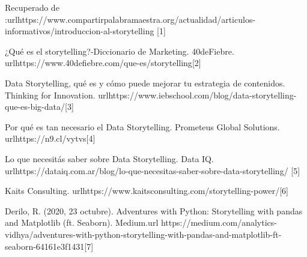 \documentclass[twoside,twocolumn]{article}
\begin{document}
\begin{thebibliography}{} 

	\newblock  Recuperado de :url{https://www.compartirpalabramaestra.org/actualidad/articulos-informativos/introduccion-al-storytelling} [1]

	\bibitem[Socialmood (2020]{} 
	\newblock  ¿Qué es el storytelling?-Diccionario de Marketing. 40deFiebre. url{https://www.40defiebre.com/que-es/storytelling}[2]
	
	\newblock  Data Storytelling, qué es y cómo puede mejorar tu estrategia de contenidos. Thinking for Innovation. url{https://www.iebschool.com/blog/data-storytelling-que-es-big-data/}[3]

	\bibitem[A. (2020, 17 abril)]{} 
	\newblock  Por qué es tan necesario el Data Storytelling. Prometeus Global Solutions. url{https://n9.cl/vytvs}[4]

	\newblock Lo que necesitás saber sobre Data Storytelling. Data IQ. url{https://dataiq.com.ar/blog/lo-que-necesitas-saber-sobre-data-storytelling/} [5]
	
	\newblock Kaits Consulting. url{https://www.kaitsconsulting.com/storytelling-power/}[6]

	\newblock  Derilo, R. (2020, 23 octubre). Adventures with Python: Storytelling with pandas and Matplotlib (ft. Seaborn). Medium.url{ https://medium.com/analytics-vidhya/adventures-with-python-storytelling-with-pandas-and-matplotlib-ft-seaborn-64161e3f1431}[7]
	
\end{thebibliography}
\end{document}
